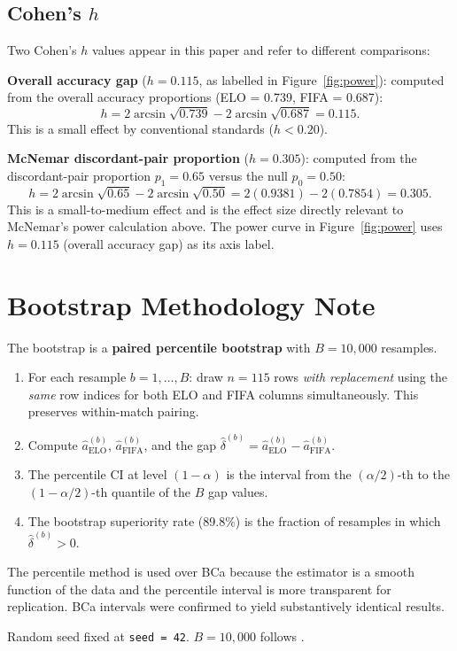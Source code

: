 \documentclass[12pt, a4paper]{article}
\begin{document}
\begin{appendices}
\subsection*{Cohen's $h$}

Two Cohen's $h$ values appear in this paper and refer to different comparisons:

\textbf{Overall accuracy gap} ($h = 0.115$, as labelled in Figure~\ref{fig:power}):
computed from the overall accuracy proportions (ELO = 0.739, FIFA = 0.687):
\[
  h = 2\arcsin\!\sqrt{0.739} - 2\arcsin\!\sqrt{0.687} = 0.115.
\]
This is a small effect by conventional standards ($h < 0.20$).

\textbf{McNemar discordant-pair proportion} ($h = 0.305$):
computed from the discordant-pair proportion $p_1 = 0.65$ versus the null $p_0 = 0.50$:
\[
  h = 2\arcsin\!\sqrt{0.65} - 2\arcsin\!\sqrt{0.50}
    = 2(0.9381) - 2(0.7854) = 0.305.
\]
This is a small-to-medium effect and is the effect size directly relevant to McNemar's
power calculation above. The power curve in Figure~\ref{fig:power} uses $h = 0.115$
(overall accuracy gap) as its axis label.

\section{Bootstrap Methodology Note}
\label{app:bootstrap}

The bootstrap is a \textbf{paired percentile bootstrap} with $B = 10{,}000$ resamples.

\begin{enumerate}
  \item For each resample $b = 1, \ldots, B$: draw $n = 115$ rows \emph{with replacement}
  using the \emph{same} row indices for both ELO and FIFA columns simultaneously. This
  preserves within-match pairing.

  \item Compute $\hat{a}_{\text{ELO}}^{(b)}$, $\hat{a}_{\text{FIFA}}^{(b)}$, and the gap
  $\hat{\delta}^{(b)} = \hat{a}_{\text{ELO}}^{(b)} - \hat{a}_{\text{FIFA}}^{(b)}$.

  \item The percentile CI at level $(1-\alpha)$ is the interval from the $(\alpha/2)$-th to
  the $(1-\alpha/2)$-th quantile of the $B$ gap values.

  \item The bootstrap superiority rate (89.8\%) is the fraction of resamples in which
  $\hat{\delta}^{(b)} > 0$.
\end{enumerate}

The percentile method is used over BCa because the estimator is a smooth function of the data
and the percentile interval is more transparent for replication. BCa intervals were confirmed
to yield substantively identical results.

Random seed fixed at \texttt{seed = 42}. $B = 10{,}000$ follows .

\end{appendices}

\end{document}
